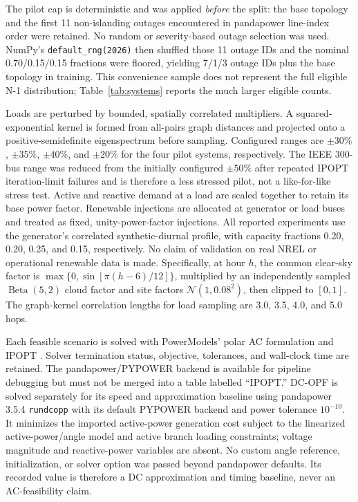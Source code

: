 \documentclass[final,5p,times,twocolumn]{elsarticle}
\begin{document}
The pilot cap is deterministic and was applied \emph{before} the split: the
base topology and the first 11 non-islanding outages encountered in
pandapower line-index order were retained. No random or severity-based outage
selection was used. NumPy's \texttt{default\_rng(2026)} then shuffled those 11
outage IDs and the nominal 0.70/0.15/0.15 fractions were floored, yielding
7/1/3 outage IDs plus the base topology in training. This convenience sample
does not represent the full eligible N-1 distribution; Table~\ref{tab:systems}
reports the much larger eligible counts.

Loads are perturbed by bounded, spatially correlated multipliers. A
squared-exponential kernel is formed from all-pairs graph distances and
projected onto a positive-semidefinite eigenspectrum before sampling. Configured
ranges are $\pm30\%$, $\pm35\%$, $\pm40\%$, and $\pm20\%$ for the four pilot
systems, respectively. The IEEE 300-bus range was reduced from the initially
configured $\pm50\%$ after repeated IPOPT iteration-limit failures and is
therefore a less stressed pilot, not a like-for-like stress test. Active and
reactive demand at a load are scaled together to retain its base power factor.
Renewable injections are allocated at generator or load buses and treated as
fixed, unity-power-factor injections. All reported experiments use the
generator's correlated synthetic-diurnal profile, with capacity fractions
0.20, 0.20, 0.25, and 0.15, respectively. No claim of validation on real NREL
or operational renewable data is made. Specifically, at hour $h$, the common
clear-sky factor is
$\max\{0,\sin[\pi(h-6)/12]\}$, multiplied by an independently sampled
$\operatorname{Beta}(5,2)$ cloud factor and site factors
$\mathcal{N}(1,0.08^2)$, then clipped to $[0,1]$. The graph-kernel correlation
lengths for load sampling are 3.0, 3.5, 4.0, and 5.0 hops.

Each feasible scenario is solved with PowerModels' polar AC formulation and
IPOPT \cite{coffrin2018powermodels,wachter2006ipopt}. Solver termination status,
objective, tolerances, and wall-clock time are retained. The pandapower/PYPOWER
backend is available for pipeline debugging but must not be merged into a table
labelled ``IPOPT.'' DC-OPF is solved separately for its speed and approximation
baseline using pandapower 3.5.4 \texttt{rundcopp} with its default PYPOWER
backend and power tolerance $10^{-10}$. It minimizes the imported active-power
generation cost subject to the linearized active-power/angle model and active
branch loading constraints; voltage magnitude and reactive-power variables
are absent. No custom angle reference, initialization, or solver option was
passed beyond pandapower defaults. Its recorded value is therefore a DC
approximation and timing baseline, never an AC-feasibility claim.
\end{document}
